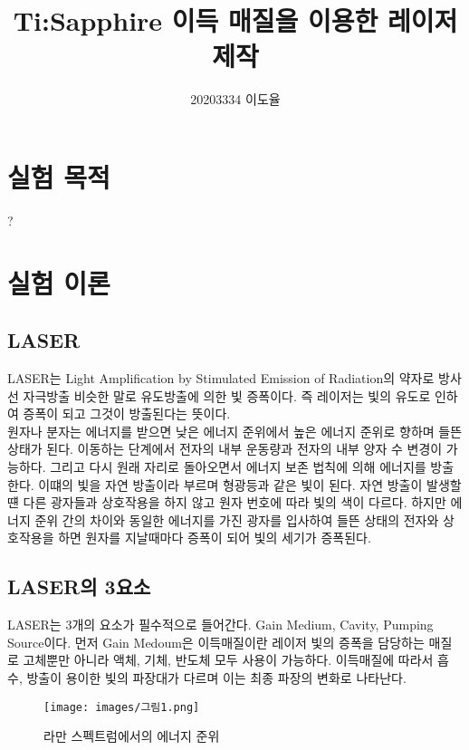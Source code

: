 \documentclass{report}
\title{Ti:Sapphire 이득 매질을 이용한 레이저 제작}
\author{20203334 이도율}
\date{}
\begin{document}
\maketitle
{}
\section{실험 목적}

?


\section{실험 이론}

\subsection{LASER}
LASER는 Light Amplification by Stimulated Emission of Radiation의 약자로 방사선 자극방출 비슷한 말로 유도방출에 의한 빛 증폭이다. 즉 레이저는 빛의 유도로 인하여 증폭이 되고 그것이 방출된다는 뜻이다.\\
원자나 분자는 에너지를 받으면 낮은 에너지 준위에서 높은 에너지 준위로 향하며 들뜬 상태가 된다. 이동하는 단계에서 전자의 내부 운동량과 전자의 내부 양자 수 변경이 가능하다.
그리고 다시 원래 자리로 돌아오면서 에너지 보존 법칙에 의해 에너지를 방출한다. 이떄의 빛을 자연 방출이라 부르며 
형광등과 같은 빛이 된다. 자연 방출이 발생할 떈 다른 광자들과 상호작용을 하지 않고 원자 번호에 따라 빛의 색이 다르다.
하지만 에너지 준위 간의 차이와 동일한 에너지를 가진 광자를 입사하여 들뜬 상태의 전자와 상호작용을 하면 
원자를 지날때마다 증폭이 되어 빛의 세기가 증폭된다.  \\

\subsection{LASER의 3요소}
LASER는 3개의 요소가 필수적으로 들어간다. Gain Medium, Cavity, Pumping Source이다.
먼저 Gain Medoum은 이득매질이란 레이저 빛의 증폭을 담당하는 매질로
고체뿐만 아니라 액체, 기체, 반도체 모두 사용이 가능하다. 이득매질에 따라서 흡수, 방출이 용이한 
빛의 파장대가 다르며 이는 최종 파장의 변화로 나타난다. 
\begin{figure}[!h]
    \centering
    \texttt{[image: images/그림1.png]}
    \caption{라만 스펙트럼에서의 에너지 준위}
    \label{fig:그림1}
\end{figure}
\ \\
\end{document}
